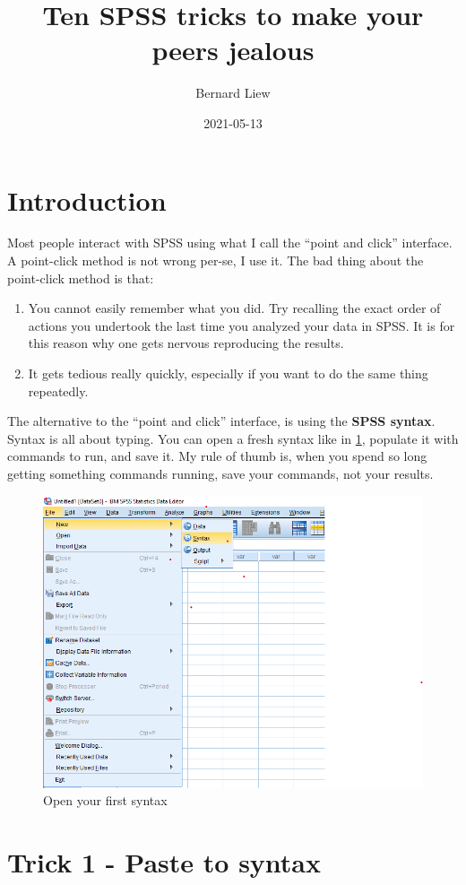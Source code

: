 \documentclass[
]{book}
\title{Ten SPSS tricks to make your peers jealous}
\author{Bernard Liew}
\date{2021-05-13}
\begin{document}
\maketitle

{
\setcounter{tocdepth}{1}
\tableofcontents
}
\hypertarget{introduction}{%
\chapter*{Introduction}\label{introduction}}

Most people interact with SPSS using what I call the ``point and click'' interface. A point-click method is not wrong per-se, I use it. The bad thing about the point-click method is that:

\begin{enumerate}
\def\labelenumi{\arabic{enumi})}
\item
  You cannot easily remember what you did. Try recalling the exact order of actions you undertook the last time you analyzed your data in SPSS. It is for this reason why one gets nervous reproducing the results.
\item
  It gets tedious really quickly, especially if you want to do the same thing repeatedly.
\end{enumerate}

The alternative to the ``point and click'' interface, is using the \textbf{SPSS syntax}. Syntax is all about typing. You can open a fresh syntax like in \ref{fig:first-syntax}, populate it with commands to run, and save it. My rule of thumb is, when you spend so long getting something commands running, save your commands, not your results.

\begin{figure}
\includegraphics[width=0.5\linewidth]{images/open_syntax} \caption{Open your first syntax}\label{fig:first-syntax}
\end{figure}

\hypertarget{trick-1---paste-to-syntax}{%
\chapter*{Trick 1 - Paste to syntax}\label{trick-1---paste-to-syntax}}
\end{document}
